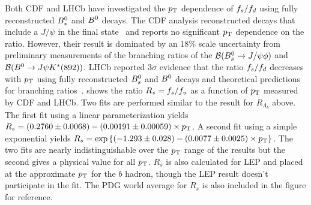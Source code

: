 Both CDF and LHCb have investigated the $p_{\rm T}$ dependence of $f_{s}/f_{d}$ using fully 
reconstructed $B^0_s$ and $B^0$ decays.  The CDF analysis reconstructed decays that include 
a $J/\psi$ in the final state~\cite{CDFnote10795:2012} and reports no significant $p_{\rm T}$ dependence 
on the ratio.  However, their result is dominated by an $18$\% scale uncertainty
from preliminary measurements of the branching ratios of the ${\cal B}(B^0_s\to J/\psi \phi)$ and 
${\cal B}(B^0\to J\psi K^{*}(892))$.
LHCb reported $3\sigma$ evidence that the ratio $f_{s}/f_{d}$ decreases with 
$p_{\rm T}$ using fully reconstructed $B^0_s$ and $B^0$ decays and theoretical predictions for branching ratios~\cite{Aaij:2013qqa}.  shows
the ratio $R_s = f_{s}/f_{u}$ as a function of $p_{\rm T}$ measured by CDF and LHCb.
Two fits are performed similar to the result for $R_{\Lambda_b}$ above.  The first
fit using a linear parameterization yields
$R_s = (0.2760\pm 0.0068) - (0.00191\pm 0.00059)\times p_{\rm T}$.  
A second fit using a simple exponential yields
$R_s = \exp\left\{(-1.293\pm 0.028) - (0.0077\pm 0.0025)\times p_{\rm T}\right\}$.  
The two fits are nearly indistinguishable over the $p_{\rm T}$ range of the results
but the second gives a physical value for all $p_{\rm T}$.  $R_s$ is also calculated
for LEP and placed at the approximate $p_{\rm T}$ for the $b$ hadron, though the LEP result
doesn't participate in the fit.  The PDG world average for $R_s$ is also included in the
figure for reference.

